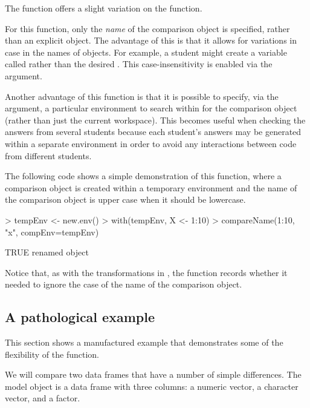 The  function offers a slight variation on the
 function.  

For this function, only the \emph{name} of
the comparison object is specified, rather than an explicit object.
The advantage of this is that it
 allows for variations in case in the names of objects.  For 
example, a student might create a variable called 
rather than the desired .  This 
case-insensitivity is enabled via
the  argument.

Another advantage of this function is that it is possible to specify,
via the  argument,
a particular environment to search within for the comparison object
(rather than just the current workspace).  This becomes useful
when checking the answers from several students because each student's
answers may be generated within a separate environment in order to avoid
any interactions between code from different students.

The following code shows a simple demonstration of this function,
where a comparison object is created within a temporary environment
and the name of the comparison object is upper case when it should 
be lowercase.

\begin{Schunk}
\begin{Sinput}
> tempEnv <- new.env()
> with(tempEnv, X <- 1:10)
> compareName(1:10, "x", compEnv=tempEnv)
\end{Sinput}
\begin{Soutput}
TRUE
  renamed object
\end{Soutput}
\end{Schunk}
Notice that, as with the transformations in ,
 the  
function records whether it needed to ignore the case
of the name of the comparison object.

\subsection*{A pathological example}

This section shows a manufactured example that demonstrates 
some of the flexibility of the  function.

We will compare two data frames that have a number of 
simple differences.  The model object is a data frame
with three columns:  a numeric vector, a character vector,
and a factor.

